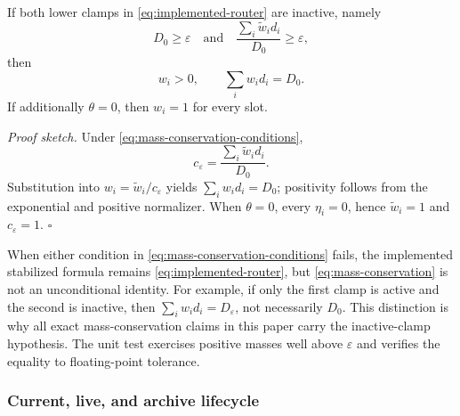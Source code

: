 \begin{proposition}
\label{prop:conditional-mass}
If both lower clamps in \eqref{eq:implemented-router} are inactive, namely
\begin{equation}
  D_0\geq\varepsilon
  \quad\text{and}\quad
  \frac{\sum_i\widetilde w_i d_i}{D_0}
  \geq\varepsilon,
  \label{eq:mass-conservation-conditions}
\end{equation}
then
\begin{equation}
  w_i>0,
  \qquad
  \sum_iw_id_i=D_0.
  \label{eq:mass-conservation}
\end{equation}
If additionally \(\theta=0\), then \(w_i=1\) for every slot.
\end{proposition}
\noindent\emph{Proof sketch.}
Under \eqref{eq:mass-conservation-conditions},
\[
  c_\varepsilon
  =
  \frac{\sum_i\widetilde w_i d_i}{D_0}.
\]
Substitution into \(w_i=\widetilde w_i/c_\varepsilon\) yields
\(\sum_iw_id_i=D_0\); positivity follows from the exponential and positive
normalizer.  When \(\theta=0\), every \(\eta_i=0\), hence
\(\widetilde w_i=1\) and \(c_\varepsilon=1\). \hfill\(\square\)

\begin{remark}
\label{rem:active-clamp}
When either condition in \eqref{eq:mass-conservation-conditions} fails, the
implemented stabilized formula remains \eqref{eq:implemented-router}, but
\eqref{eq:mass-conservation} is not an unconditional identity.  For example,
if only the first clamp is active and the second is inactive, then
\(\sum_iw_id_i=D_\varepsilon\), not necessarily \(D_0\).  This distinction is
why all exact mass-conservation claims in this paper carry the inactive-clamp
hypothesis.  The unit test exercises positive masses well above
\(\varepsilon\) and verifies the equality to floating-point tolerance.
\end{remark}

\subsubsection{Current, live, and archive lifecycle}

